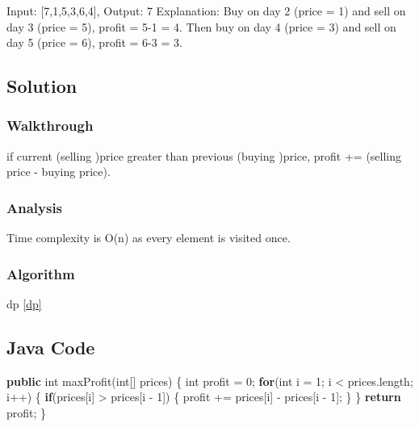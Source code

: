 \documentclass[]{book}
\newenvironment{Shaded}{\begin{snugshade}}{\end{snugshade}}
\newcommand{\DataTypeTok}[1]{\textcolor[rgb]{0.13,0.29,0.53}{#1}}
\newcommand{\DecValTok}[1]{\textcolor[rgb]{0.00,0.00,0.81}{#1}}
\newcommand{\FunctionTok}[1]{\textcolor[rgb]{0.00,0.00,0.00}{#1}}
\newcommand{\KeywordTok}[1]{\textcolor[rgb]{0.13,0.29,0.53}{\textbf{#1}}}
\newcommand{\NormalTok}[1]{#1}
\begin{document}
Input: {[}7,1,5,3,6,4{]}, Output: 7
Explanation: Buy on day 2 (price = 1) and sell on day 3 (price = 5), profit = 5-1 = 4.
Then buy on day 4 (price = 3) and sell on day 5 (price = 6), profit = 6-3 = 3.

\hypertarget{solution-28}{%
\subsection{Solution}\label{solution-28}}

\hypertarget{walkthrough-34}{%
\subsubsection{Walkthrough}\label{walkthrough-34}}

if current (selling )price greater than previous (buying )price, profit += (selling price - buying price).

\hypertarget{analysis-37}{%
\subsubsection{Analysis}\label{analysis-37}}

Time complexity is O(n) as every element is visited once.

\hypertarget{algorithm-37}{%
\subsubsection{Algorithm}\label{algorithm-37}}

dp \ref{dp}

\hypertarget{java-code-31}{%
\subsection{Java Code}\label{java-code-31}}

\begin{Shaded}
\begin{Highlighting}[]
\KeywordTok{public} \DataTypeTok{int} \FunctionTok{maxProfit}\NormalTok{(}\DataTypeTok{int}\NormalTok{[] prices) \{}
    \DataTypeTok{int}\NormalTok{ profit = }\DecValTok{0}\NormalTok{;}
    \KeywordTok{for}\NormalTok{(}\DataTypeTok{int}\NormalTok{ i = }\DecValTok{1}\NormalTok{; i < prices.}\FunctionTok{length}\NormalTok{; i++) \{}
        \KeywordTok{if}\NormalTok{(prices[i] > prices[i - }\DecValTok{1}\NormalTok{]) \{}
\NormalTok{            profit += prices[i] - prices[i - }\DecValTok{1}\NormalTok{];}
\NormalTok{        \}}
\NormalTok{    \}}
    \KeywordTok{return}\NormalTok{ profit;}
\NormalTok{\}}
\end{Highlighting}
\end{Shaded}
\end{document}
